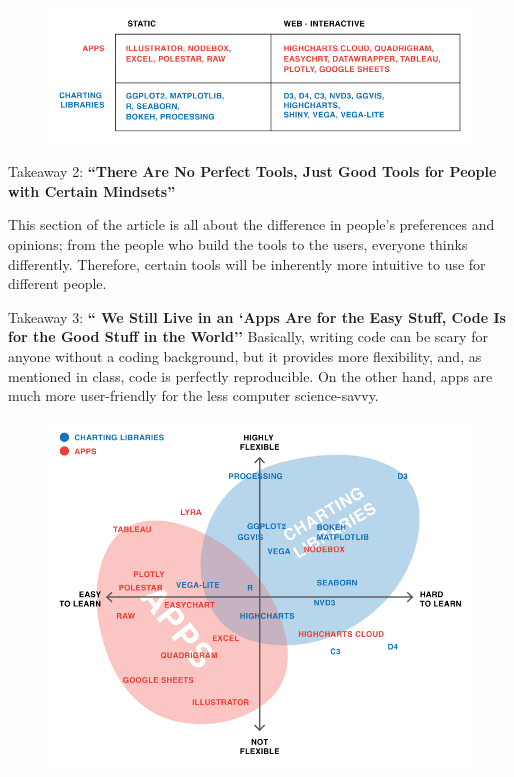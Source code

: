 \documentclass[]{book}
\theoremstyle{definition}
\theoremstyle{definition}
\theoremstyle{definition}
\theoremstyle{remark}
\begin{document}
\begin{figure}
\centering
\includegraphics{images/interactivity.png}
\caption{}
\end{figure}

Takeaway 2: \textbf{``There Are No Perfect Tools, Just Good Tools for
People with Certain Mindsets''}

This section of the article is all about the difference in people's
preferences and opinions; from the people who build the tools to the
users, everyone thinks differently. Therefore, certain tools will be
inherently more intuitive to use for different people.

Takeaway 3: \textbf{`` We Still Live in an `Apps Are for the Easy Stuff,
Code Is for the Good Stuff in the World''} Basically, writing code can
be scary for anyone without a coding background, but it provides more
flexibility, and, as mentioned in class, code is perfectly reproducible.
On the other hand, apps are much more user-friendly for the less
computer science-savvy.

\begin{figure}
\centering
\includegraphics{images/apps_vs_code.png}
\caption{}
\end{figure}
\end{document}

